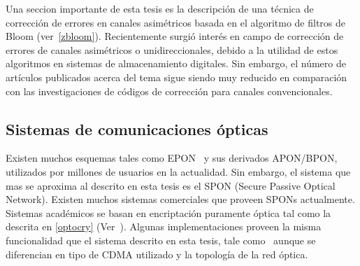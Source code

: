 Una seccion importante de esta tesis es la descripción de una técnica de corrección de errores en canales asimétricos basada en el algoritmo de filtros de Bloom (ver~\ref{zbloom}). Recientemente surgió interés en campo de corrección de errores de canales asimétricos o unidireccionales, debido a la utilidad de estos algoritmos en sistemas de almacenamiento digitales\cite{tanakamaru201195}. Sin embargo, el número de artículos publicados acerca del tema sigue siendo muy reducido en comparación con las investigaciones de códigos de corrección para canales convencionales.

\subsection{Sistemas de comunicaciones ópticas}

Existen muchos esquemas tales como EPON~\cite{kramer2002ethernet} y sus derivados APON/BPON, utilizados por millones de usuarios en la actualidad.
Sin embargo, el sistema que mas se aproxima al descrito en esta tesis es el SPON (Secure Passive Optical Network). Existen muchos sistemas comerciales que proveen SPONs actualmente. Sistemas académicos se basan en encriptación puramente óptica tal como la descrita en \ref{optocry} (Ver~\cite{cincotti2009secure}). Algunas implementaciones proveen la misma funcionalidad que el sistema descrito en esta tesis, tale como~\cite{nadarajah2006implementation} aunque se diferencian en tipo de CDMA utilizado y la topología de la red óptica.
